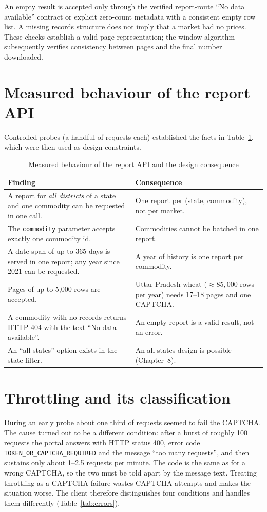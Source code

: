 \documentclass[12pt,a4paper,oneside]{report}
\numberwithin{equation}{chapter}
\numberwithin{figure}{chapter}
\numberwithin{table}{chapter}
\theoremstyle{definition}
\begin{document}
An empty result is accepted only through the verified report-route ``No data available'' contract or explicit zero-count metadata with a consistent empty row list. A missing records structure does not imply that a market had no prices. These checks establish a valid page representation; the window algorithm subsequently verifies consistency between pages and the final number downloaded.

\section{Measured behaviour of the report API}
Controlled probes (a handful of requests each) established the facts in Table~\ref{tab:apifacts}, which were then used as design constraints.

\begin{table}[H]
\centering
\caption{Measured behaviour of the report API and the design consequence}
\label{tab:apifacts}
\small
\begin{tabular}{@{}p{}p{}@{}}
\toprule
Finding & Consequence \\
\midrule
A report for \emph{all districts} of a state and one commodity can be requested in one call. & One report per (state, commodity), not per market. \\
The \texttt{commodity} parameter accepts exactly one commodity id. & Commodities cannot be batched in one report. \\
A date span of up to 365 days is served in one report; any year since 2021 can be requested. & A year of history is one report per commodity. \\
Pages of up to 5,000 rows are accepted. & Uttar Pradesh wheat ($\approx 85{,}000$ rows per year) needs 17--18 pages and one CAPTCHA. \\
A commodity with no records returns HTTP 404 with the text ``No data available''. & An empty report is a valid result, not an error. \\
An ``all states'' option exists in the state filter. & An all-states design is possible (Chapter~8). \\
\bottomrule
\end{tabular}
\end{table}

\section{Throttling and its classification}\label{sec:throttle}
During an early probe about one third of requests seemed to fail the CAPTCHA. The cause turned out to be a different condition: after a burst of roughly 100 requests the portal answers with HTTP status 400, error code \texttt{TOKEN\_OR\_CAPTCHA\_REQUIRED} and the message ``too many requests'', and then sustains only about 1--2.5 requests per minute. The code is the same as for a wrong CAPTCHA, so the two must be told apart by the message text. Treating throttling as a CAPTCHA failure wastes CAPTCHA attempts and makes the situation worse. The client therefore distinguishes four conditions and handles them differently (Table~\ref{tab:errors}).
\end{document}

